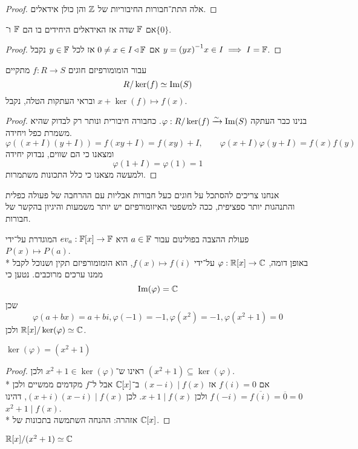 \begin{proof}
	אלה התת־חבורות החיבוריות של $\mathbb{Z}$ והן כולן אידאלים.
\end{proof}
\begin{proposition}
	אם $\mathbb{F}$ שדה אז האידאלים היחידים בו הם $\mathbb{F}$ ו־$\{ 0 \}$.
\end{proposition}
\begin{proof}
	אם $0 \ne x \in I \triangleleft \mathbb{F}$ אז לכל $y \in \mathbb{F}$ נקבל $y = {(yx)}^{-1} x \in I \implies I = \mathbb{F}$.
\end{proof}
\begin{theorem}
	עבור הומומורפיזם חוגים $f : R \to S$ מתקיים
	\[
		R / \ker(f) \simeq \operatorname{Im}(S)
	\]
	ובראי העתקות הטלה, נקבל $x + \ker(f) \mapsto f(x)$.
\end{theorem}
\begin{proof}
	בנינו כבר העתקה $\varphi : R / \ker(f) \xrightarrow{\sim} \operatorname{Im}(S)$.
	כחבורה חיבורית ונותר רק לבדוק שהיא משמרת כפל ויחידה.
	\[
		\varphi((x + I)(y + I)) = f(xy + I) = f(xy) + I,
		\qquad
		\varphi(x + I)\varphi(y + I) = f(x)f(y)
	\]
	ומצאנו כי הם שווים, נבדוק יחידה
	\[
		\varphi(1 + I) = \varphi(1) = 1
	\]
	ולמעשה מצאנו כי כלל התכונות משתמרות.
\end{proof}
אנחנו צריכים להסתכל על חוגים כעל חבורות אבליות עם ההרחבה של פעולה כפלית והתנהגות יותר ספציפית, ככה למשפטי האיזומורפיזם יש יותר משמעות והיגיון בהקשר של חבורות.
\begin{example}
	פעולת ההצבה בפולינום עבור $a \in \mathbb{F}$ היא $ev_a : \mathbb{F}[x] \to \mathbb{F}$ המוגדרת על־ידי $P(x) \mapsto P(a)$. \\*
	באופן דומה, $\varphi : \mathbb{R}[x] \to \mathbb{C}$ על־ידי $f(x) \mapsto f(i)$, הוא הומומורפיזם תקין ושנוכל לקבל ממנו ערכים מרוכבים.
	נטען כי
	\[
		\operatorname{Im}(\varphi) = \mathbb{C}
	\]
	שכן
	\[
		\varphi(a + bx) = a + bi, \varphi(-1) = -1, \varphi(x^2) = -1, \varphi(x^2 + 1) = 0
	\]
	ולכן $\mathbb{R}[x] / \ker(\varphi) \simeq \mathbb{C}$.
\end{example}
\begin{lemma}
	$\ker(\varphi) = (x^2 + 1)$
\end{lemma}
\begin{proof}
	ראינו ש־$x^2 + 1 \in \ker(\varphi)$ ולכן $(x^2 + 1) \subseteq \ker(\varphi)$. \\*
	אם $f(i) = 0$ אז $(x - i) \mid f(x)$ ב־$\mathbb{C}[x]$ אבל ל־$f$ מקדמים ממשיים ולכן $f(-i) = \overline{f(i)} = \overline{0} = 0$ ולכן $x + 1 \mid f(x)$.
	לכן $(x + i)(x - i) \mid f(x)$, דהינו $x^2 + 1 \mid f(x)$. \\*
	אזהרה: ההנחה השתמשה בתכונות של $\mathbb{C}[x]$.
\end{proof}
\begin{conclusion}
	$\mathbb{R}[x] / (x^2 + 1) \simeq \mathbb{C}$
\end{conclusion}

